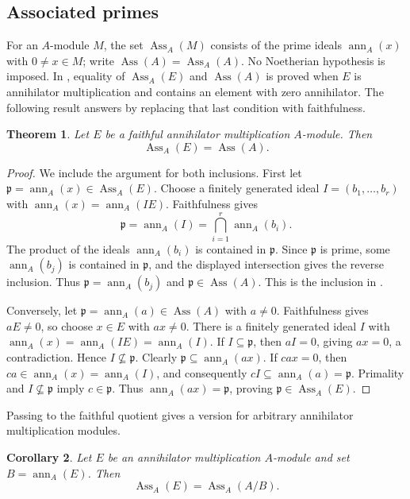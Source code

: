 \documentclass[11pt]{amsart}
\theoremstyle{plain}
\newtheorem{theorem}{Theorem}[section]
\newtheorem{corollary}[theorem]{Corollary}
\theoremstyle{definition}
\theoremstyle{remark}
\DeclareMathOperator{\Ass}{Ass}
\newcommand{\ann}{\operatorname{ann}}
\numberwithin{equation}{section}
\begin{document}
\subsection{Associated primes}

For an $A$-module $M$, the set $\Ass_A(M)$ consists of the prime ideals
$\ann_A(x)$ with $0\ne x\in M$; write $\Ass(A)=\Ass_A(A)$.
No Noetherian hypothesis is imposed. In
\cite[Theorem~6(ii)]{KocAMM}, equality of $\Ass_A(E)$ and $\Ass(A)$ is
proved when $E$ is annihilator multiplication and contains an element with
zero annihilator. The following result answers
\cite[Question~1]{KocAMM} by replacing that last condition with faithfulness.

\begin{theorem}\label{thm:associated-primes}
Let $E$ be a faithful annihilator multiplication $A$-module. Then
\[
\Ass_A(E)=\Ass(A).
\]
\end{theorem}

\begin{proof}
We include the argument for both inclusions. First let
$\mathfrak p=\ann_A(x)\in\Ass_A(E)$.
Choose a finitely generated ideal $I=(b_1,\ldots,b_r)$ with
$\ann_A(x)=\ann_A(IE)$. Faithfulness gives
\[
\mathfrak p=\ann_A(I)=\bigcap_{i=1}^r\ann_A(b_i).
\]
The product of the ideals $\ann_A(b_i)$ is contained in $\mathfrak p$.
Since $\mathfrak p$ is prime, some $\ann_A(b_j)$ is contained in
$\mathfrak p$, and the displayed intersection gives the reverse inclusion.
Thus $\mathfrak p=\ann_A(b_j)$ and $\mathfrak p\in\Ass(A)$.
This is the inclusion in \cite[Theorem~6(i)]{KocAMM}.

Conversely, let $\mathfrak p=\ann_A(a)\in\Ass(A)$ with $a\ne0$.
Faithfulness gives $aE\ne0$, so choose $x\in E$ with $ax\ne0$.
There is a finitely generated ideal $I$ with
$\ann_A(x)=\ann_A(IE)=\ann_A(I)$.
If $I\subseteq\mathfrak p$, then $aI=0$, giving $ax=0$, a contradiction.
Hence $I\not\subseteq\mathfrak p$.
Clearly $\mathfrak p\subseteq\ann_A(ax)$.
If $cax=0$, then $ca\in\ann_A(x)=\ann_A(I)$, and consequently
$cI\subseteq\ann_A(a)=\mathfrak p$.
Primality and $I\not\subseteq\mathfrak p$ imply $c\in\mathfrak p$.
Thus $\ann_A(ax)=\mathfrak p$, proving $\mathfrak p\in\Ass_A(E)$.
\end{proof}

Passing to the faithful quotient gives a version for arbitrary annihilator
multiplication modules.

\begin{corollary}\label{cor:associated-faithful-quotient}
Let $E$ be an annihilator multiplication $A$-module and set
$B=\ann_A(E)$. Then
\[
\Ass_A(E)=\Ass_A(A/B).
\]
\end{corollary}
\end{document}
